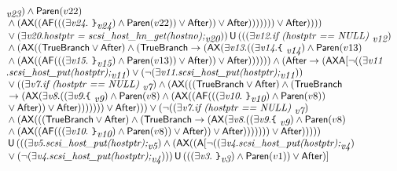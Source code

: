\documentclass{article}
\newcommand{\U}{\,\mbox{\sf{U}}\,}
\newcommand{\A}{\mbox{\sf{A}}}
\newcommand{\AX}{\mbox{\sf{AX}}}
\newcommand{\AF}{\mbox{\sf{AF}}}
\newcommand{\mita}[1]{\mbox{\it{{#1}}}}
\newcommand{\msf}[1]{\mbox{\sf{{#1}}}}
\newcommand{\ttlb}{\mbox{\tt \char'173}}
\newcommand{\ttrb}{\mbox{\tt \char'175}}
\begin{document}
\[\begin{array}{l}
{  }_{\mita{v23}}) \wedge \msf{Paren}(v22)\\\mbox{} \wedge (\AX((\AF(((\exists \mita{v24} . \mita{
{\ttrb}}_{\mita{v24}}) \wedge \msf{Paren}(v22)) \vee \msf{After})) \vee \msf{After}))))))) \vee \msf{After}))))\\\mbox{} \vee (\exists \mita{v20} . \mita{hostptr = scsi\_host\_hn\_get(hostno);}_{\mita{v20}})) \U (((\exists \mita{v12} . \mita{if (hostptr == NULL) }_{\mita{v12}})\\\mbox{} \wedge (\AX((\msf{TrueBranch} \vee \msf{After}) \wedge (\msf{TrueBranch} \rightarrow (\AX(\exists \mita{v13} . ((\exists \mita{v14} . \mita{{\ttlb}
  }_{\mita{v14}}) \wedge \msf{Paren}(v13)\\\mbox{} \wedge (\AX((\AF(((\exists \mita{v15} . \mita{
{\ttrb}}_{\mita{v15}}) \wedge \msf{Paren}(v13)) \vee \msf{After})) \vee \msf{After})))))) \wedge (\msf{After} \rightarrow (\AX\A[\neg ((\exists \mita{v11}\\\mbox{} . \mita{scsi\_host\_put(hostptr);}_{\mita{v11}}) \vee (\neg (\exists \mita{v11} . \mita{scsi\_host\_put(hostptr);}_{\mita{v11}}))\\\mbox{} \vee ((\exists \mita{v7} . \mita{if (hostptr == NULL) }_{\mita{v7}}) \wedge (\AX(((\msf{TrueBranch} \vee \msf{After}) \wedge (\msf{TrueBranch}\\\mbox{} \rightarrow (\AX(\exists \mita{v8} . ((\exists \mita{v9} . \mita{{\ttlb}
  }_{\mita{v9}}) \wedge \msf{Paren}(v8) \wedge (\AX((\AF(((\exists \mita{v10} . \mita{
{\ttrb}}_{\mita{v10}}) \wedge \msf{Paren}(v8))\\\mbox{} \vee \msf{After})) \vee \msf{After}))))))) \vee \msf{After}))) \vee (\neg ((\exists \mita{v7} . \mita{if (hostptr == NULL) }_{\mita{v7}})\\\mbox{} \wedge (\AX(((\msf{TrueBranch} \vee \msf{After}) \wedge (\msf{TrueBranch} \rightarrow (\AX(\exists \mita{v8} . ((\exists \mita{v9} . \mita{{\ttlb}
  }_{\mita{v9}}) \wedge \msf{Paren}(v8)\\\mbox{} \wedge (\AX((\AF(((\exists \mita{v10} . \mita{
{\ttrb}}_{\mita{v10}}) \wedge \msf{Paren}(v8)) \vee \msf{After})) \vee \msf{After}))))))) \vee \msf{After})))))\\\mbox{} \U (((\exists \mita{v5} . \mita{scsi\_host\_put(hostptr);}_{\mita{v5}}) \wedge (\AX((\A[\neg ((\exists \mita{v4} . \mita{scsi\_host\_put(hostptr);}_{\mita{v4}})\\\mbox{} \vee (\neg (\exists \mita{v4} . \mita{scsi\_host\_put(hostptr);}_{\mita{v4}}))) \U (((\exists \mita{v3} . \mita{
{\ttrb}}_{\mita{v3}}) \wedge \msf{Paren}(v1)) \vee \msf{After})]

\end{array}\]
\end{document}
